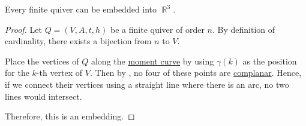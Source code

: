 \begin{proposition}\label{thm:quiver_can_be_embedded_into_r3}
  Every finite quiver can be embedded into \( \BbbR^3 \).
\end{proposition}
\begin{proof}
  Let \( Q = (V, A, t, h) \) be a finite quiver of order \( n \). By definition of cardinality, there exists a bijection from \( n \) to \( V \).

  Place the vertices of \( Q \) along the \hyperref[thm:moment_curve]{moment curve} by using \( \gamma(k) \) as the position for the \( k \)-th vertex of \( V \). Then by , no four of these points are \hyperref[def:collinear_complanar]{complanar}. Hence, if we connect their vertices using a straight line where there is an arc, no two lines would intersect.

  Therefore, this is an embedding.
\end{proof}

